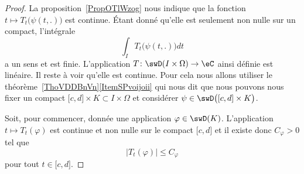 \begin{proof}
	La proposition~\ref{PropOTlWzog} nous indique que la fonction \( t\mapsto T_t\big( \psi(t,.) \big)\) est continue. Étant donné qu'elle est seulement non nulle sur un compact, l'intégrale
	\begin{equation}
		\int_IT_t\big( \psi(t,.) \big)dt
	\end{equation}
	a un sens et est finie. L'application \( T\colon \swD(I\times \Omega)\to \eC\) ainsi définie est linéaire. Il reste à voir qu'elle est continue. Pour cela nous allons utiliser le théorème~\ref{ThoVDDBnVn}\ref{ItemSPvoijoii} qui nous dit que nous pouvons nous fixer un compact \( \mathopen[ c , d \mathclose]\times K\subset I\times\Omega\) et considérer \( \psi\in \swD\big( \mathopen[ c , d \mathclose]\times K \big)\).

	Soit, pour commencer, donnée une application \( \varphi\in\swD(K)\). L'application \( t\mapsto T_t(\varphi)\) est continue et non nulle sur le compact \( \mathopen[ c,d\mathclose]\) et il existe donc \( C_{\varphi}>0\) tel que
	\begin{equation}
		| T_t(\varphi) |\leq C_{\varphi}
	\end{equation}
	pour tout \( t\in\mathopen[ c , d \mathclose]\).


\end{proof}
